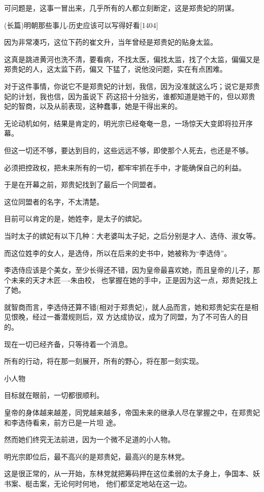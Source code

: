 \documentclass[11pt,a4paper,onecolumn]{article}
\begin{document}
可问题是，这事一冒出来，几乎所有的人都立刻断定，这是郑贵妃的阴谋。

(长篇)明朝那些事儿-历史应该可以写得好看$[$1404$]$

因为非常凑巧，这位下药的崔文升，当年曾经是郑贵妃的贴身太监。

这真是跳进黄河也洗不清，要看病，不找太医，偏找太监，找了个太监，偏偏又是郑贵妃的人，这太监下药，偏又
下猛了，说他没问题，实在有点困难。

对于这件事情，你说它不是郑贵妃的计划，我信，因为没准就这么巧；说它是郑贵妃的计划，我也信，因为虽说下
药这招十分拙劣，谁都知道是她干的，但以郑贵妃的智商，以及从前表现，这种蠢事，她是干得出来的。

无论动机如何，结果是肯定的，明光宗已经奄奄一息，一场惊天大变即将拉开序幕。

但这一切还不够，要达到目的，这些远远不够，即使那个人死去，也还是不够。

必须把控政权，把未来所有的一切，都牢牢抓在手中，才能确保自己的利益。

于是在开幕之前，郑贵妃找到了最后一个同盟者。

这位同盟者的名字，不太清楚。

目前可以肯定的是，她姓李，是太子的嫔妃。

当时太子的嫔妃有以下几种：大老婆叫太子妃，之后分别是才人、选侍、淑女等。

而这位姓李的女人，是选侍，所以在后来的史书中，她被称为``李选侍''。

李选侍应该是个美女，至少长得还不错，因为皇帝最喜欢她，而且皇帝的儿子，那个未来的天才木匠----朱由校，
也掌握在她的手中，正是因为这一点，郑贵妃找上了她。

就智商而言，李选侍还算不错(相对于郑贵妃)，就人品而言，她和郑贵妃实在是相见恨晚，经过一番潜规则后，双
方达成协议，成为了同盟，为了不可告人的目的。

现在一切已经齐备，只等待着一个消息。

所有的行动，将在那一刻展开，所有的野心，将在那一刻实现。

小人物

目标就在眼前，一切都很顺利。

皇帝的身体越来越差，同党越来越多，帝国未来的继承人尽在掌握之中，在郑贵妃和李选侍看来，前方已是一片坦
途。

然而她们终究无法前进，因为一个微不足道的小人物。

明光宗即位后，最不高兴的是郑贵妃，最高兴的是东林党。

这是很正常的，从一开始，东林党就把筹码押在这位柔弱的太子身上，争国本、妖书案、梃击案，无论何时何地，
他们都坚定地站在这一边。
\end{document}

